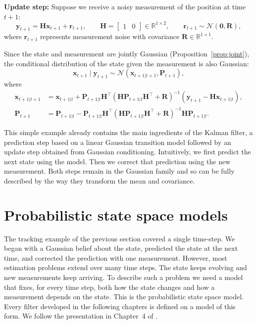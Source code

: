 \begin{example}
\textbf{Update step:} Suppose we receive a noisy measurement of the position at time $t+1$:
\[
\mathbf{y}_{t+1}
=\mathbf{H}\mathbf{x}_{t+1} + \mathbf{r}_{t+1},
\qquad
\mathbf{H} =
    \begin{bmatrix}
    1 & 0
    \end{bmatrix}
\in \mathbb{R}^{1\times2},
\qquad
\mathbf{r}_{t+1} \sim \mathcal{N}(\mathbf{0},\mathbf{R}),
\]
where $\mathbf{r}_{t+1}$ represents measurement noise with covariance $\mathbf{R} \in \mathbb{R}^{1\times1}$.

Since the state and measurement are jointly Gaussian (Proposition~\ref{prop:joint}), the conditional distribution of the state given the measurement is also Gaussian:
\[
\mathbf{x}_{t+1} \mid \mathbf{y}_{t+1} \sim \mathcal{N}(\mathbf{x}_{t+1|t+1},\mathbf{P}_{t+1}),
\]
where
\begin{align*}
    \mathbf{x}_{t+1|t+1} &=\mathbf{x}_{t+1|t}+\mathbf{P}_{t+1|t}\mathbf{H}^\top(\mathbf{H}\mathbf{P}_{t+1|t}\mathbf{H}^\top + \mathbf{R})^{-1}(\mathbf{y}_{t+1} - \mathbf{H}\mathbf{x}_{t+1|t}),\\
    \mathbf{P}_{t+1} &= \mathbf{P}_{t+1|t}-\mathbf{P}_{t+1|t}\mathbf{H}^\top(\mathbf{H}\mathbf{P}_{t+1|t}\mathbf{H}^\top + \mathbf{R})^{-1}\mathbf{H}\mathbf{P}_{t+1|t}.
\end{align*}

This simple example already contains the main ingredients of the Kalman filter, a prediction step based on a linear Gaussian transition model followed by an update step obtained from Gaussian conditioning.
Intuitively, we first predict the next state using the model. Then we correct that prediction using the new measurement. Both steps remain in the Gaussian family and so can be fully described by the way they transform the mean and covariance.
\end{example}


\section{Probabilistic state space models}\label{sec: state space model}
The tracking example of the previous section covered a single time-step. We began with a Gaussian belief about the state, predicted the state at the next time, and corrected the prediction with one measurement. However, most estimation problems extend over many time steps. The state keeps evolving and new measurements keep arriving. To describe such a problem we need a model that fixes, for every time step, both how the state changes and how a measurement depends on the state. This is the probabilistic state space model. Every filter developed in the following chapters is defined on a model of this form. We follow the presentation in Chapter~4 of \cite{sarkka:bayesian_filtering}.

